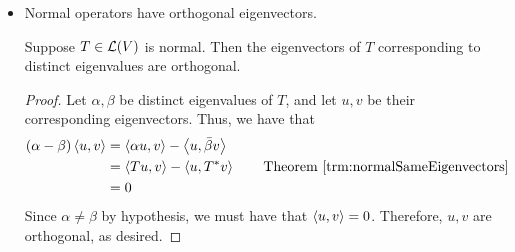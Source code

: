 \documentclass[../main.tex]{subfiles}
\begin{document}
\begin{itemize}
\begin{theorem}
\begin{proof}
\begin{align*}
                &= (T-\lambda I)^*(T-\lambda I)
            \end{align*}
            Thus, $T-\lambda I$ is self-adjoint. It follows by Theorem \ref{trm:normalNorm} that
            \begin{equation*}
                0 = \norm{(T-\lambda I)v} = \norm{(T-\lambda I)^*v} = \norm{(T^*-\bar{\lambda}I)v}
            \end{equation*}
            Hence $v$ is an eigenvector of $T^*$ with eigenvalue $\bar{\lambda}$, as desired.
        \end{proof}
    \end{theorem}
    \item Normal operators have orthogonal eigenvectors.
    \begin{theorem}
        Suppose $T\in\mathcal{L}(V)$ is normal. Then the eigenvectors of $T$ corresponding to distinct eigenvalues are orthogonal.
        \begin{proof}
            Let $\alpha,\beta$ be distinct eigenvalues of $T$, and let $u,v$ be their corresponding eigenvectors. Thus, we have that
            \begin{align*}
                (\alpha-\beta)\inp{u}{v} &= \inp{\alpha u}{v}-\inp{u}{\bar{\beta}v}\\
                &= \inp{Tu}{v}-\inp{u}{T^*v}\tag*{Theorem \ref{trm:normalSameEigenvectors}}\\
                &= 0
            \end{align*}
            Since $\alpha\neq\beta$ by hypothesis, we must have that $\left\langle{u},{v}\right\rangle=0$. Therefore, $u,v$ are orthogonal, as desired.
        \end{proof}
    \end{theorem}
\end{itemize}
\end{document}

